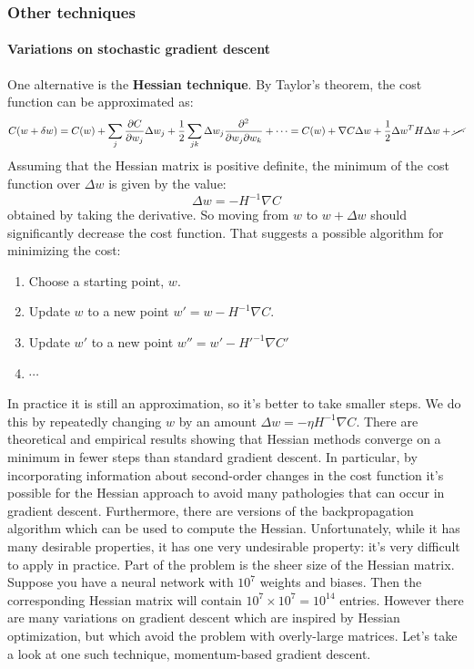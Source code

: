 \documentclass[12pt, letterpaper]{article}
\theoremstyle{definition}
\newcommand{\pr}{\mathrm{\partial}}
\let\tb\textbf
\begin{document}
\subsubsection{Other techniques}
\paragraph{\tb{Variations on stochastic gradient descent}} One alternative is the \tb{Hessian technique}. By Taylor's theorem, the cost function can be approximated as:
\begin{equation}
C(w+\delta w) = C(w) +\sum_j \frac{\pr C}{\pr w_j}\Delta w_j +\frac{1}{2} \sum_{jk} \Delta w_j \frac{\pr^ 2}{\pr w_j \pr w_k} + \cdots = C(w) + \nabla C \Delta w +\frac{1}{2} \Delta w^T H  \Delta w +\cancel{\cdots}
\end{equation} 
Assuming that the Hessian matrix is positive definite, the minimum of the cost function over $\Delta w$ is given by the value:
\begin{equation}
\Delta w = - H^{-1} \nabla C
\end{equation}
obtained by taking the derivative. So moving from $w$ to $w+\Delta w$ should significantly decrease the cost function. That suggests a possible algorithm for minimizing the cost:
\begin{enumerate}
\item Choose a starting point, $w$.
\item Update $w$ to a new point $w'=w-H^{-1}\nabla C$.
\item Update $w'$ to a new point $w''=w'-H'^{-1} \nabla C'$
\item $\cdots$
\end{enumerate}
In practice it is still an approximation, so it's better to take smaller steps. We do this by repeatedly changing $w$  by an amount $\Delta w = -\eta H^{-1} \nabla C$.
There are theoretical and empirical results showing that Hessian methods converge on a minimum in fewer steps than standard gradient descent. In particular, by incorporating information about second-order changes in the cost function it's possible for the Hessian approach to avoid many pathologies that can occur in gradient descent. Furthermore, there are versions of the backpropagation algorithm which can be used to compute the Hessian. 
Unfortunately, while it has many desirable properties, it has one very undesirable property: it's very difficult to apply in practice. Part of the problem is the sheer size of the Hessian matrix. Suppose you have a neural network with $10^7$ weights and biases. Then the corresponding Hessian matrix will contain $10^7\times 10^7=10^{14}$ entries. However there are many variations on gradient descent which are inspired by Hessian optimization, but which avoid the problem with overly-large matrices. Let's take a look at one such technique, momentum-based gradient descent.
\end{document}
